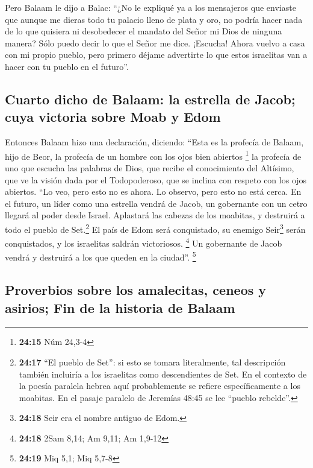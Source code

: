  Pero Balaam le dijo a Balac: ``¿No le expliqué ya a los
mensajeros que enviaste  que aunque me dieras todo tu
palacio lleno de plata y oro, no podría hacer nada de lo que quisiera ni
desobedecer el mandato del Señor mi Dios de ninguna manera? Sólo puedo
decir lo que el Señor me dice.  ¡Escucha! Ahora vuelvo a
casa con mi propio pueblo, pero primero déjame advertirte lo que estos
israelitas van a hacer con tu pueblo en el futuro''.

\hypertarget{cuarto-dicho-de-balaam-la-estrella-de-jacob-cuya-victoria-sobre-moab-y-edom}{%
\subsection{Cuarto dicho de Balaam: la estrella de Jacob; cuya victoria
sobre Moab y
Edom}\label{cuarto-dicho-de-balaam-la-estrella-de-jacob-cuya-victoria-sobre-moab-y-edom}}

 Entonces Balaam hizo una declaración, diciendo: ``Esta
es la profecía de Balaam, hijo de Beor, la profecía de un hombre con los
ojos bien abiertos \footnote{\textbf{24:15} Núm 24,3-4} 
la profecía de uno que escucha las palabras de Dios, que recibe el
conocimiento del Altísimo, que ve la visión dada por el Todopoderoso,
que se inclina con respeto con los ojos abiertos.  ``Lo
veo, pero esto no es ahora. Lo observo, pero esto no está cerca. En el
futuro, un líder como una estrella vendrá de Jacob, un gobernante con un
cetro llegará al poder desde Israel. Aplastará las cabezas de los
moabitas, y destruirá a todo el pueblo de Set.\footnote{\textbf{24:17}
  ``El pueblo de Set'': si esto se tomara literalmente, tal descripción
  también incluiría a los israelitas como descendientes de Set. En el
  contexto de la poesía paralela hebrea aquí probablemente se refiere
  específicamente a los moabitas. En el pasaje paralelo de Jeremías
  48:45 se lee ``pueblo rebelde''.}  El país de Edom será
conquistado, su enemigo Seir\footnote{\textbf{24:18} Seir era el nombre
  antiguo de Edom.} serán conquistados, y los israelitas saldrán
victoriosos. \footnote{\textbf{24:18} 2Sam 8,14; Am 9,11; Am 1,9-12}
 Un gobernante de Jacob vendrá y destruirá a los que
queden en la ciudad''. \footnote{\textbf{24:19} Miq 5,1; Miq 5,7-8}

\hypertarget{proverbios-sobre-los-amalecitas-ceneos-y-asirios-fin-de-la-historia-de-balaam}{%
\subsection{Proverbios sobre los amalecitas, ceneos y asirios; Fin de la
historia de
Balaam}\label{proverbios-sobre-los-amalecitas-ceneos-y-asirios-fin-de-la-historia-de-balaam}}


